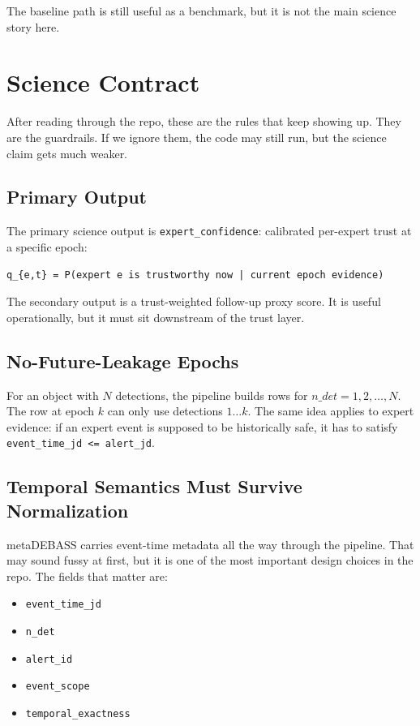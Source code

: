 \documentclass[11pt]{article}
\newcommand{\code}[1]{\texttt{#1}}
\begin{document}
The baseline path is still useful as a benchmark, but it is not the main science story here.

\section{Science Contract}

After reading through the repo, these are the rules that keep showing up. They are the guardrails. If we ignore them, the code may still run, but the science claim gets much weaker.

\subsection{Primary Output}

The primary science output is \code{expert\_confidence}: calibrated per-expert trust at a specific epoch:

\begin{verbatim}
q_{e,t} = P(expert e is trustworthy now | current epoch evidence)
\end{verbatim}

The secondary output is a trust-weighted follow-up proxy score. It is useful operationally, but it must sit downstream of the trust layer.

\subsection{No-Future-Leakage Epochs}

For an object with $N$ detections, the pipeline builds rows for $n\_det = 1, 2, \dots, N$. The row at epoch $k$ can only use detections $1 \dots k$. The same idea applies to expert evidence: if an expert event is supposed to be historically safe, it has to satisfy \code{event\_time\_jd <= alert\_jd}.

\subsection{Temporal Semantics Must Survive Normalization}

metaDEBASS carries event-time metadata all the way through the pipeline. That may sound fussy at first, but it is one of the most important design choices in the repo. The fields that matter are:

\begin{itemize}
\item \code{event\_time\_jd}
\item \code{n\_det}
\item \code{alert\_id}
\item \code{event\_scope}
\item \code{temporal\_exactness}
\end{itemize}
\end{document}

